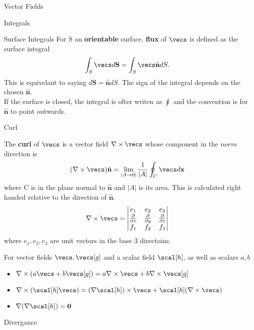 \documentclass[12pt, letterpaper]{article}
\newcommand{\x}{\textbf{x}}
\newcommand{\norm}{\hat{\textbf{n}}}
\newcommand{\pder}[2]{\frac{\partial{} #1}{\partial{} #2}}
\begin{document}
\begin{section}{Vector Fields}
\begin{subsection}{Integrals}
\begin{subsubsection}{Surface Integrals}
      For S an \textbf{orientable} surface, \textbf{flux} of \(\vecs\) is
      defined as the surface integral \[\int_{S} \vecs d \textbf{S} =
        \int_{S} \vecs \norm dS.\] This is equivelant to saying
      \(d \textbf{S} = \norm dS\). The sign of the integral depends on the
      chosen \(\norm\). \\
      If the surface is closed, the integral is ofter writen as \(\oint\) and
      the convention is for \(\norm\) to point outwards.

    \end{subsubsection}

  \end{subsection}

  \begin{subsection}{Curl}

    The \textbf{curl} of \(\vecs\) is a vector field \(\nabla \times \vecs\)
    whose component in the \(norm\) direction is \[(\nabla \times \vecs) \norm{}
      = \lim_{| A \to{} 0|} \frac{1}{| A |} \oint_{C} \vecs d \x\] where C is
    in the plane normal to \(\norm\) and \(| A |\) is its area. This is
    calculated right handed relative to the direction of \(\norm\).
    \[\nabla \times \vecs = \begin{vmatrix}
                                e_{1} & e_{2} & e_{3} \\
                                \pder{}{x} & \pder{}{y} & \pder{}{z} \\
                                f_{1} & f_{2} & f_{3} \end{vmatrix}\]
    where \(e_{1}, e_{2}, e_{3}\) are unit vectors in the base 3 directoins.

    For vector fields \(\vecs, \vecs[g]\) and a scalar field \(\scal[h]\), as
    well as scalars \(a, b\)
    \begin{itemize}
      \item \(\nabla \times (a \vecs + b \vecs[g]) =
            a \nabla \times \vecs + b \nabla \times \vecs[g]\)
      \item \(\nabla \times (\scal[h] \vecs) =
            (\nabla \scal[h]) \times \vecs + \scal[h] (\nabla \times \vecs)\)
      \item \(\nabla (\nabla \scal[h]) = \textbf{0}\)
    \end{itemize}

  \end{subsection}

  \begin{subsection}{Divergance}


\end{subsection}
\end{section}
\end{document}
